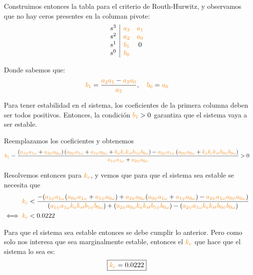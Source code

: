 Construimos entonces la tabla para el criterio de Routh-Hurwitz, y observamos
que no hay ceros presentes en la columan pivote:
\begin{equation}
  \begin{array}{c|cc}
    s^3 & \nara{a_3} & \nara{a_1} \\
    s^2 & \nara{a_2} & \nara{a_0} \\
    s^1 & \nara{b_1} & 0 \\
    s^0 & \nara{b_0} & 
  \end{array}
\end{equation}

Donde sabemos que:
\begin{align}
  \nara{b_1} = \frac{\nara{a_2 a_1} - \nara{a_3 a_0}}{\nara{a_2}},\quad
  \nara{b_0} = \nara{a_0}
\end{align}

Para tener estabilidad en el sistema, los coeficientes de la primera columna
deben ser todos positivos. Entonces, la condición $\nara{b_1} > 0$ garantiza
que el sistema vaya a ser estable.

Reemplazamos los coeficientes y obtenemos
\begin{equation}
    \nara{b_1}=\frac{
        \left(\nara{a_{1\psi} a_{1\omega}} + \nara{a_{2\psi} a_{0\omega}}\right)
        \left(\nara{a_{0\psi} a_{1\omega}} + \nara{a_{1\psi} a_{0\omega}} + \nara{k_a k_c k_{st} b_{1\psi} b_{0\omega}}\right) 
        - \nara{a_{2\psi} a_{1\omega}} 
        \left(\nara{a_{0\psi} a_{0\omega}} + \nara{k_a k_c k_{st} b_{0\psi} b_{0\omega}}\right)
    }{
        \nara{a_{1\psi} a_{1\omega}} + \nara{a_{2\psi} a_{0\omega}}
    } > 0
\end{equation}

Resolvemos entonces para $\nara{k_{c}}$, y vemos que para que el sistema sea
estable se necesita que
\begin{align}
       \nara{k_{c}} &< \dfrac{-(\nara{a_{1\psi} a_{1\omega}}(\nara{a_{0\psi} a_{1\omega}} + \nara{a_{1\psi} a_{0\omega}}) + \nara{ a_{2\psi} a_{0\omega} }(\nara{a_{0\psi} a_{1\omega}} + \nara{a_{1\psi} a_{0\omega}}) - \nara{a_{2\psi} a_{1\omega} a_{0\psi} a_{0\omega}})}  {(\nara{a_{1\psi} a_{1\omega} k_a k_{st} b_{1\psi} b_{0\omega}}) + (\nara{a_{2\psi} a_{0\omega} k_a k_{st} b_{1\psi} b_{0\omega}}) - (\nara{a_{2\psi} a_{1\omega} k_a k_{st} b_{0\psi} b_{0\omega}})} \\
  \iff \nara{k_{c}} &< 0.0222
\end{align}

Para que el sistema sea estable entonces se debe cumplir lo anterior. Pero
como solo nos interesa que sea marginalmente estable, entonces el $\nara{k_{c}}$
que hace que el sistema lo sea es:
\begin{equation}
    \boxed{\nara{k_c} = 0.0222}
\end{equation}


